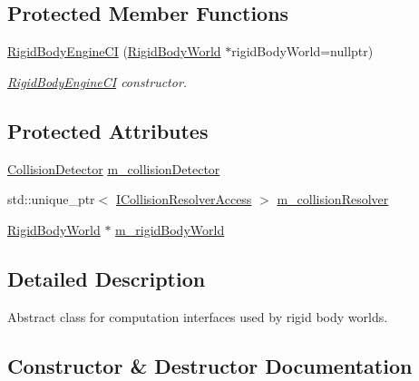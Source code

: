 \subsection*{Protected Member Functions}
\begin{DoxyCompactItemize}
\item 
\mbox{\hyperlink{classr3_1_1_rigid_body_engine_c_i_a10d9cbc84de1412abd7798f638831a35}{Rigid\+Body\+Engine\+CI}} (\mbox{\hyperlink{classr3_1_1_rigid_body_world}{Rigid\+Body\+World}} $\ast$rigid\+Body\+World=nullptr)
\begin{DoxyCompactList}\small\item\em \mbox{\hyperlink{classr3_1_1_rigid_body_engine_c_i}{Rigid\+Body\+Engine\+CI}} constructor. \end{DoxyCompactList}\end{DoxyCompactItemize}
\subsection*{Protected Attributes}
\begin{DoxyCompactItemize}
\item 
\mbox{\hyperlink{classr3_1_1_collision_detector}{Collision\+Detector}} \mbox{\hyperlink{classr3_1_1_rigid_body_engine_c_i_adb37ed2c686594f9504680be76c2dcbc}{m\+\_\+collision\+Detector}}
\item 
std\+::unique\+\_\+ptr$<$ \mbox{\hyperlink{classr3_1_1_i_collision_resolver_access}{I\+Collision\+Resolver\+Access}} $>$ \mbox{\hyperlink{classr3_1_1_rigid_body_engine_c_i_a27f09a82ab77919c2fb78869f6d3c035}{m\+\_\+collision\+Resolver}}
\item 
\mbox{\hyperlink{classr3_1_1_rigid_body_world}{Rigid\+Body\+World}} $\ast$ \mbox{\hyperlink{classr3_1_1_rigid_body_engine_c_i_afd7ae3fcba8b88ec6c31f2df56aae3f6}{m\+\_\+rigid\+Body\+World}}
\end{DoxyCompactItemize}


\subsection{Detailed Description}
Abstract class for computation interfaces used by rigid body worlds. 

\subsection{Constructor \& Destructor Documentation}
\mbox{\label{classr3_1_1_rigid_body_engine_c_i_a9f75c8c49e987206554b09550d93b341}} 
